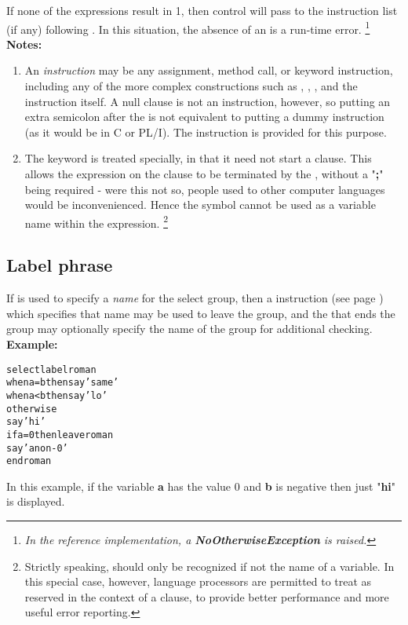 If none of the  expressions result in 1, then control will
pass to the instruction list (if any) following .
In this situation, the absence of an  is a run-time
error.
\footnote{
\emph{In the reference implementation, a \textbf{NoOtherwiseException}
is raised.}
}
 \textbf{Notes:}
\begin{enumerate}
\item An \emph{instruction} may be any assignment, method call, or keyword
instruction, including any of the more complex constructions such as
, , , and the 
instruction itself.
A null clause is not an instruction, however, so putting an extra
semicolon after the  is not equivalent to putting a dummy
instruction (as it would be in C or PL/I).
The  instruction is provided for this purpose.
\item The keyword  is treated specially, in that it need not
start a clause.
This allows the expression on the  clause to be terminated
by the , without a "\textbf{;}" being required
- were this not so, people used to other computer languages would
be inconvenienced.
Hence the symbol  cannot be used as a variable name within
the expression.
\footnote{
Strictly speaking,  should only be recognized if not
the name of a variable.  In this special case, however, \nr{} language
processors are permitted to treat  as reserved in the
context of a  clause, to provide better performance and
more useful error reporting.
}
\end{enumerate}
\subsection{Label phrase}
 
If  is used to specify a \emph{name} for the select
group, then a   instruction (see page \pageref{refleave})  which
specifies that name may be used to leave the group, and the 
that ends the group may optionally specify the name of the group for
additional checking.
 \textbf{Example:}
\begin{alltt}
select label roman
  when a=b then say 'same'
  when a<b then say 'lo'
  otherwise
    say 'hi'
    if a=0 then leave roman
    say 'a non-0'
  end roman
\end{alltt}
In this example, if the variable \textbf{a} has the value 0
and \textbf{b} is negative then just "\textbf{hi}" is
displayed.
